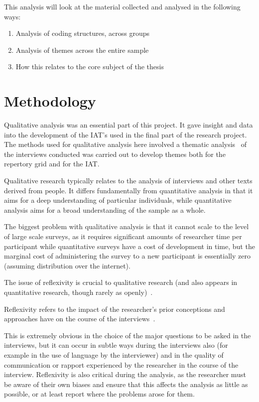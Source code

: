 This analysis will look at the material collected and analysed in the following ways:

\begin{enumerate}
\item  Analysis of coding structures, across groups
\item Analysis of themes across the entire sample 
\item How this relates to the core subject of the thesis
\end{enumerate}

\section{Methodology}

Qualitative analysis was an essential part of this project.  
It gave insight and data into the development of the IAT's used in the final part of the research project.
The methods used for qualitative analysis here involved a thematic analysis~\cite{braun2006using} of the interviews conducted was carried out to develop themes both for the repertory grid and for the IAT.

Qualitative research typically relates to the analysis of interviews and other texts derived from people. It differs fundamentally from quantitative analysis in that it aims for a deep understanding of particular individuals, while quantitative analysis aims for a broad understanding of the sample as a whole. 

The biggest problem with qualitative analysis is that it cannot scale to the level of large scale surveys, as it requires significant amounts of researcher time per participant while quantitative surveys have a cost of development in time, but the marginal cost of administering the survey to a new participant is essentially zero (assuming distribution over the internet).

The issue of reflexivity is crucial to qualitative research (and also appears in quantitative research, though rarely as openly)~\cite{rosenthal1967covert, rosenthal1969interpersonal}.

Reflexivity refers to the impact of the researcher's prior conceptions and approaches have on the course of the interviews~\cite{finlay2002outing}.

This is extremely obvious in the choice of the major questions to be asked in the interviews, but it can occur in subtle ways during the interviews also (for example in the use of language by the interviewer) and in the quality of communication or rapport experienced by the researcher in the course of the interview. Reflexivity is also critical during the analysis, as the researcher must be aware of their own biases and ensure that this affects the analysis as little as possible, or at least report where the problems arose for them.

